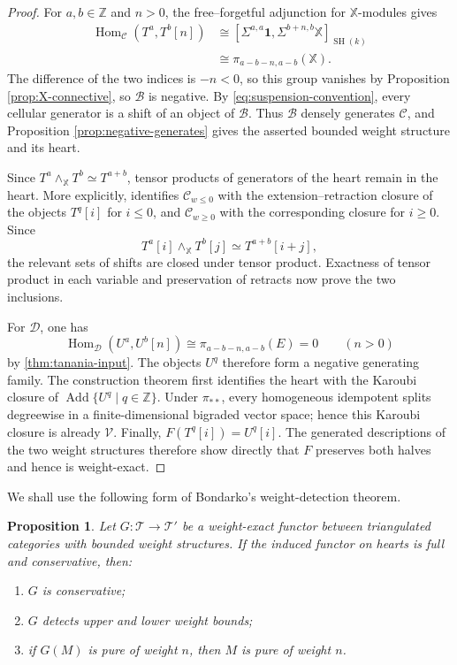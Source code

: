\documentclass[11pt]{amsart}
\numberwithin{equation}{section}
\newtheorem{proposition}[theorem]{Proposition}
\theoremstyle{definition}
\theoremstyle{remark}
\DeclareMathOperator{\Hom}{Hom}
\DeclareMathOperator{\Add}{Add}
\DeclareMathOperator{\SH}{SH}
\newcommand{\X}{\mathbb X}
\newcommand{\one}{\mathbf 1}
\newcommand{\C}{\mathcal C}
\newcommand{\D}{\mathcal D}
\newcommand{\V}{\mathcal V}
\newcommand{\B}{\mathcal B}
\begin{document}
\begin{proof}
For $a,b\in\mathbb Z$ and $n>0$, the free--forgetful adjunction for
$\X$-modules gives
\begin{align*}
  \Hom_{\C}(T^a,T^b[n])
  &\cong
  [\Sigma^{a,a}\one,\Sigma^{b+n,b}\X]_{\SH(k)}\\
  &\cong\pi_{a-b-n,a-b}(\X).
\end{align*}
The difference of the two indices is $-n<0$, so this group vanishes by Proposition 
\ref{prop:X-connective}, so $\B$ is negative.  By
\eqref{eq:suspension-convention}, every cellular generator is a shift of an
object of $\B$.  Thus $\B$ densely generates $\C$, and Proposition 
\ref{prop:negative-generates} gives the asserted bounded weight structure
and its heart.

Since $T^a\wedge_{\X}T^b\simeq T^{a+b}$, tensor products of generators of the
heart remain in the heart.  More explicitly,
\cite[Corollary~2.1.2(3)]{BondarkoSosnilo} identifies
$\C_{w\le0}$ with the extension--retraction closure of the objects
$T^q[i]$ for $i\le0$, and $\C_{w\ge0}$ with the corresponding closure for
$i\ge0$.  Since
\[
  T^a[i]\wedge_{\X}T^b[j]\simeq T^{a+b}[i+j],
\]
the relevant sets of shifts are closed under tensor product.  Exactness of
tensor product in each variable and preservation of retracts now prove the
two inclusions.

For $\D$, one has
\[
  \Hom_{\D}(U^a,U^b[n])
  \cong\pi_{a-b-n,a-b}(E)=0
  \qquad(n>0)
\]
by \cref{thm:tanania-input}.  The objects $U^q$ therefore form a negative
generating family.  The construction theorem first identifies the heart with
the Karoubi closure of $\Add\{U^q\mid q\in\mathbb Z\}$.  Under $\pi_{**}$,
every homogeneous idempotent splits degreewise in a finite-dimensional
bigraded vector space; hence this Karoubi closure is already $\V$.  Finally,
$F(T^q[i])=U^q[i]$.  The generated descriptions of the two weight structures
therefore show directly that $F$ preserves both halves and hence is
weight-exact.
\end{proof}

We shall use the following form of Bondarko's weight-detection theorem.

\begin{proposition}\label{prop:weight-detection}
Let $G\colon\mathcal T\to\mathcal T'$ be a weight-exact functor between
triangulated categories with bounded weight structures.  If the induced
functor on hearts is full and conservative, then:
\begin{enumerate}[label=\textup{(\roman*)}]
\item $G$ is conservative;
\item $G$ detects upper and lower weight bounds;
\item if $G(M)$ is pure of weight $n$, then $M$ is pure of weight $n$.
\end{enumerate}
\end{proposition}
\end{document}
